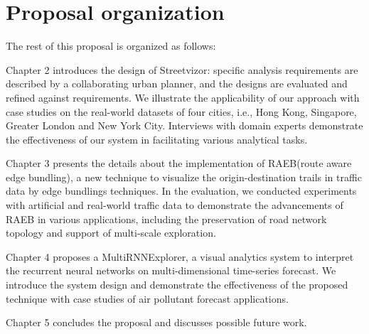\section{Proposal organization}


The rest of this proposal is organized as follows:

Chapter 2 introduces the design of Streetvizor: specific analysis requirements are described by a collaborating urban planner, and the designs are evaluated and refined against requirements. We illustrate the applicability of our approach with case studies on the real-world datasets of four cities, i.e., Hong Kong, Singapore, Greater London and New York City. Interviews with domain experts demonstrate the effectiveness of our system in facilitating various analytical tasks.

Chapter 3 presents the details about the implementation of RAEB(route aware edge bundling), a new technique to visualize the origin-destination trails in traffic data by edge bundlings techniques. In the evaluation, we conducted experiments with artificial and real-world traffic data to demonstrate the advancements of RAEB in various applications, including the preservation of road network topology and support of multi-scale exploration. 

Chapter 4 proposes a MultiRNNExplorer, a visual analytics system to interpret the recurrent neural networks on multi-dimensional time-series forecast. We introduce the system design and demonstrate the effectiveness of the proposed technique with case studies of air pollutant forecast applications.


Chapter 5 concludes the proposal and discusses possible future work.